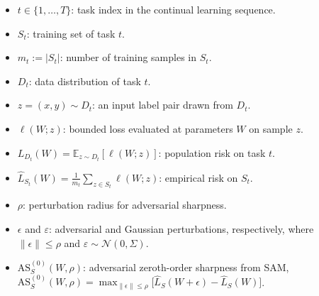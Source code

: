 \documentclass[10pt]{article} %
\begin{document}
\begin{itemize}
\item $t\in\{1,\dots,T\}$: task index in the continual learning sequence. %
\item $S_t$: training set of task $t$.
\item $m_t := |S_t|$: number of training samples in $S_t$.
\item $D_t$: data distribution of task $t$.
\item $z=(x,y)\sim D_t$: an input label pair drawn from $D_t$.
\item $\ell(W;z)$: bounded loss evaluated at parameters $W$ on sample $z$.
\item $L_{D_t}(W)=\mathbb E_{z\sim D_t}[\ell(W;z)]$: population risk on task $t$. 
\item $\widehat L_{S_t}(W)=\frac{1}{m_t}\sum_{z\in S_t}\ell(W;z)$: empirical risk on $S_t$.




\item $\rho$: perturbation radius for adversarial sharpness.

\item $\epsilon$ and $\varepsilon$: adversarial and Gaussian perturbations, respectively, where $\|\epsilon\|\le \rho$ and $\varepsilon\sim\mathcal N(0,\Sigma)$.

\item $\mathrm{AS}^{(0)}_S(W,\rho)$: adversarial zeroth-order sharpness from SAM,
$\mathrm{AS}^{(0)}_S(W,\rho)=\max_{\|\epsilon\|\le\rho}\big[\widehat L_S(W+\epsilon)-\widehat L_S(W)\big]$.


\end{itemize}
\end{document}
